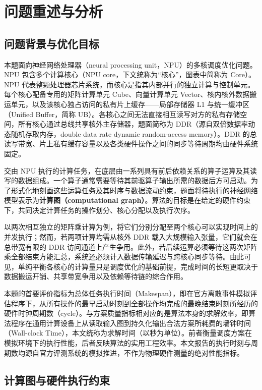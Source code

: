 \documentclass[anonymous,withtoc]{gmcm2026}
\begin{document}
\section{问题重述与分析}

\subsection{问题背景与优化目标}

本题面向神经网络处理器（neural processing unit，NPU）的多核调度优化问题。NPU 包含多个计算核心（NPU core，下文统称为``核心''，图表中简称为 Core）。NPU 代表整颗处理器芯片系统，而核心是指其内部并行的独立计算与控制单元。每个核心配备专用的矩阵计算单元 Cube、向量计算单元 Vector、核内核外数据搬运单元，以及该核心独占访问的私有片上缓存------局部存储器 L1 与统一缓冲区（Unified Buffer，简称 UB）。各核心之间无法直接相互读写对方的私有存储空间，所有核心通过总线共享核外主存储器，题面简称为 DDR（源自双倍数据率动态随机存取内存，double data rate dynamic random-access memory）。DDR 的总读写带宽、片上私有缓存容量以及各类硬件操作之间的同步等待周期均由硬件系统固定。

交由 NPU 执行的计算任务，在底层由一系列具有前后依赖关系的算子运算及其读写的数据组成。一个算子通常需要等待其前驱算子输出所需的数据后方可启动。为了形式化地刻画这些运算任务及其时序与数据流动约束，题面将待执行的神经网络模型表示为\textbf{计算图（computational graph）}。算法的目标是在给定的硬件约束下，共同决定计算任务的操作划分、核心分配以及执行次序\cite{ref1}。

以两次相互独立的矩阵乘计算为例，将它们分别分配至两个核心可以实现时间上的并发执行；然而，若两项计算均需从核外 DDR 载入大规模输入张量，它们就会在总带宽有限的 DDR 访问通道上产生争用。此外，若后续运算必须等待这两次矩阵乘全部结束方能汇总，系统还必须计入数据传输延迟与跨核心同步等待。由此可见，单纯平衡各核心的计算量只是调度优化的基础前提，完成时间的长短更取决于数据搬运开销、共享带宽争用以及依赖等待链的综合作用。

本题的首要评价指标为总体任务执行时间（Makespan），即在官方离散事件模拟评估程序下，从所有操作的最早启动时刻到全部操作均完成的最晚结束时刻所经历的硬件时钟周期数（cycle）。与方案质量指标相对应的是算法本身的求解效率，即算法程序在通用计算设备上从读取输入图到持久化输出合法方案所耗费的墙钟时间（Wall-clock Time），本文统称为求解时间（以秒为单位）。前者衡量调度方案在模拟环境下的执行性能，后者反映算法的实用工程效率。本文报告的执行时刻与周期数均源自官方评测系统的模拟推进，不作为物理硬件测量的绝对性能指标。

\subsection{计算图与硬件执行约束}
\end{document}
